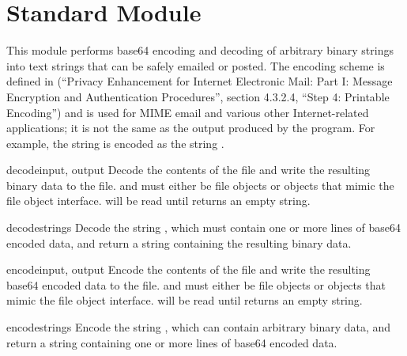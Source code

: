 \section{Standard Module }



This module performs base64 encoding and decoding of arbitrary binary
strings into text strings that can be safely emailed or posted.  The
encoding scheme is defined in  (``Privacy Enhancement for
Internet Electronic Mail: Part I: Message Encryption and
Authentication Procedures'', section 4.3.2.4, ``Step 4: Printable
Encoding'') and is used for MIME email and
various other Internet-related applications; it is not the same as the
output produced by the  program.  For example, the
string  is encoded as the string
.  


\begin{funcdesc}{decode}{input, output}
Decode the contents of the  file and write the resulting
binary data to the  file.
 and  must either be file objects or objects that
mimic the file object interface.  will be read until
 returns an empty string.
\end{funcdesc}

\begin{funcdesc}{decodestring}{s}
Decode the string , which must contain one or more lines of
base64 encoded data, and return a string containing the resulting
binary data.
\end{funcdesc}

\begin{funcdesc}{encode}{input, output}
Encode the contents of the  file and write the resulting
base64 encoded data to the  file.
 and  must either be file objects or objects that
mimic the file object interface.  will be read until
 returns an empty string.
\end{funcdesc}

\begin{funcdesc}{encodestring}{s}
Encode the string , which can contain arbitrary binary data,
and return a string containing one or more lines of
base64 encoded data.
\end{funcdesc}
